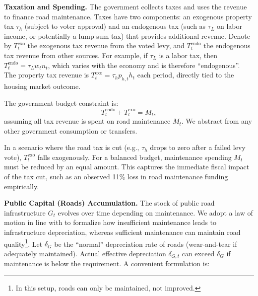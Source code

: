 {\bf Taxation and Spending.}
The government collects taxes and uses the revenue to finance road maintenance. Taxes have two components: an exogenous property tax $\tau_h$ (subject to voter approval) and an endogenous tax (such as $\tau_L$ on labor income, or potentially a lump-sum tax) that provides additional revenue. Denote by $T^{\text{exo}}_t$ the exogenous tax revenue from the voted levy, and $T^{\text{endo}}_t$ the endogenous tax revenue from other sources. For example, if $\tau_L$ is a labor tax, then $T^{\text{endo}}_t = \tau_L w_t n_t$, which varies with the economy and is therefore “endogenous”. The property tax revenue is $T^{\text{exo}}_t = \tau_h p_{h,t} h_t$ each period, directly tied to the housing market outcome.

\vskip 0.3cm

The government budget constraint is:
\begin{equation}
T^{\text{endo}}_t + T^{\text{exo}}_t = M_t,
\end{equation}
assuming all tax revenue is spent on road maintenance $M_t$. We abstract from any other government consumption or transfers.

\vskip 0.3cm

In a scenario where the road tax is cut (e.g., $\tau_h$ drops to zero after a failed levy vote), $T^{\text{exo}}_t$ falls exogenously. For a balanced budget, maintenance spending $M_t$ must be reduced by an equal amount. This captures the immediate fiscal impact of the tax cut, such as an observed 11\% loss in road maintenance funding empirically.

\vskip 0.3cm

{\bf Public Capital (Roads) Accumulation.}
The stock of public road infrastructure $G_t$ evolves over time depending on maintenance. We adopt a law of motion in line with \cite{rioja2003} to formalize how insufficient maintenance leads to infrastructure depreciation, whereas sufficient maintenance can maintain road quality\footnote{In this setup, roads can only be maintained, not improved.}. Let $\delta_G$ be the “normal” depreciation rate of roads (wear-and-tear if adequately maintained). Actual effective depreciation $\delta_{G,t}$ can exceed $\delta_G$ if maintenance is below the requirement. A convenient formulation is:

